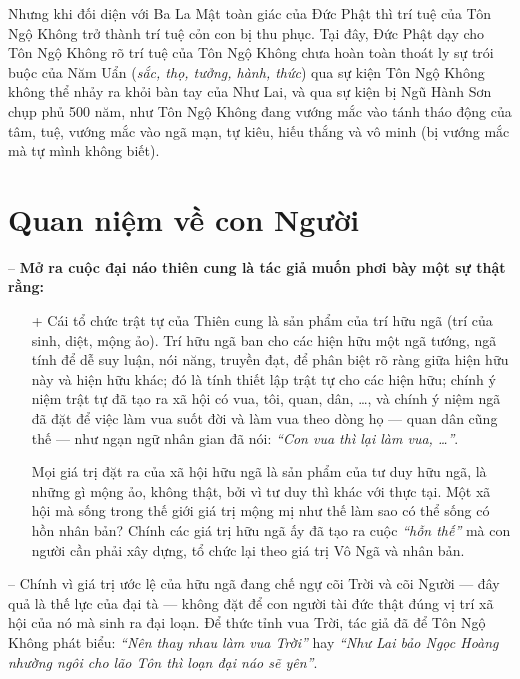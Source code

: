 Nhưng khi đối diện với Ba La Mật toàn giác của Đức Phật thì trí tuệ của Tôn Ngộ Không trở thành trí tuệ cỏn con bị thu phục. Tại đây, Đức Phật dạy cho Tôn Ngộ Không rõ trí tuệ của Tôn Ngộ Không chưa hoàn toàn thoát ly sự trói buộc của Năm Uẩn (\emph{sắc, thọ, tưởng, hành, thức}) qua sự kiện Tôn Ngộ Không không thể nhảy ra khỏi bàn tay của Như Lai, và qua sự kiện bị Ngũ Hành Sơn chụp phủ 500 năm, như Tôn Ngộ Không đang vướng mắc vào tánh tháo động của tâm, tuệ, vướng mắc vào ngã mạn, tự kiêu, hiếu thắng và vô minh (bị vướng mắc mà tự mình không biết).


\section{Quan niệm về con Người} %
\label{sec:4_con_nguoi}

-- {\bf Mở ra cuộc đại náo thiên cung là tác giả muốn phơi bày một sự thật rằng:}

\begin{enumerate}[label=\itshape\alph*\upshape/]

    \item[+] Cái tổ chức trật tự của Thiên cung là sản phẩm của trí hữu ngã (trí của sinh, diệt, mộng ảo). Trí hữu ngã ban cho các hiện hữu một ngã tướng, ngã tính để dễ suy luận, nói năng, truyền đạt, để phân biệt rõ ràng giữa hiện hữu này và hiện hữu khác; đó là tính thiết lập trật tự cho các hiện hữu; chính ý niệm trật tự đã tạo ra xã hội có vua, tôi, quan, dân, \ldots, và chính ý niệm ngã đã đặt để việc làm vua suốt đời và làm vua theo dòng họ --- quan dân cũng thế --- như ngạn ngữ nhân gian đã nói: \emph{``Con vua thì lại làm vua, \ldots''}.

    Mọi giá trị đặt ra của xã hội hữu ngã là sản phẩm của tư duy hữu ngã, là những gì mộng ảo, không thật, bởi vì tư duy thì khác với thực tại. Một xã hội mà sống trong thế giới giá trị mộng mị như thế làm sao có thể sống có hồn nhân bản? Chính các giá trị hữu ngã ấy đã tạo ra cuộc \emph{``hỗn thế''} mà con người cần phải xây dựng, tổ chức lại theo giá trị Vô Ngã và nhân bản.
\end{enumerate}

-- Chính vì giá trị ước lệ của hữu ngã đang chế ngự cõi Trời và cõi Người --- đây quả là thế lực của đại tà --- không đặt để con người tài đức thật đúng vị trí xã hội của nó mà sinh ra đại loạn. Để thức tỉnh vua Trời, tác giả đã để Tôn Ngộ Không phát biểu: \emph{``Nên thay nhau làm vua Trời''} hay \emph{``Như Lai bảo Ngọc Hoàng nhường ngôi cho lão Tôn thì loạn đại náo sẽ yên''}.

